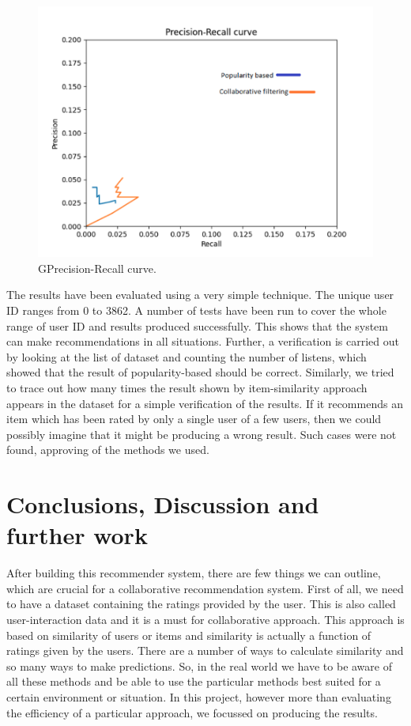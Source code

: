 \documentclass{jot}
\begin{document}
\begin{figure}[h!]
    \centering%
    \includegraphics[width=\textwidth]{evaluation}
    \caption{GPrecision-Recall curve.}
    \label{fig:evaluation}
\end{figure}%

The results have been evaluated using a very simple technique. The unique user ID ranges from 0 to 3862. A number of tests have been run to cover the whole range of user ID and results produced successfully. This shows that the system can make recommendations in all situations. Further, a verification is carried out by looking at the list of dataset and counting the number of listens, which showed that the result of popularity-based should be correct.
Similarly, we tried to trace out how many times the result shown by item-similarity approach appears in the dataset for a simple verification of the results. If it recommends an item which has been rated by only a single user of a few users, then we could possibly imagine that it might be producing a wrong result. Such cases were not found, approving of the methods we used.

\section{Conclusions, Discussion and further work}

After building this recommender system, there are few things we can outline, which are crucial for a collaborative recommendation system. First of all, we need to have a dataset containing the ratings provided by the user. This is also called user-interaction data and it is a must for collaborative approach. This approach is based on similarity of users or items and similarity is actually a function of ratings given by the users. There are a number of ways to calculate similarity and so many ways to make predictions. So, in the real world we have to be aware of all these methods and be able to use the particular methods best suited for a certain environment or situation. In this project, however more than evaluating the efficiency of a particular approach, we focussed on producing the results.
\end{document}

